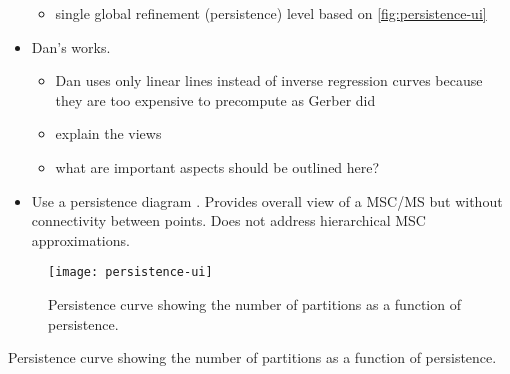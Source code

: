 \begin{itemize}
\begin{itemize}
        \item single global refinement (persistence) level based on \autoref{fig:persistence-ui}
    
    \end{itemize}

    \item Dan's works. 
    \begin{itemize}
        \item Dan uses only linear lines instead of inverse regression curves because they are too expensive to precompute as Gerber did
        \item explain the views
        \item what are important aspects should be outlined here?
    \end{itemize}
    
    \item Use a persistence diagram \cite{Cohen-Steiner07}. Provides overall view of a MSC/MS but without connectivity between points. Does not address hierarchical MSC approximations.
\end{itemize}


\begin{figure}[htb]
    \begin{center}
     \texttt{[image: persistence-ui]}
    \caption{Persistence curve showing the number of partitions as a function of persistence.}
    \label{fig:persistence-ui}
    \end{center}
\end{figure}


    \caption{Persistence curve showing the number of partitions as a function of persistence.}

